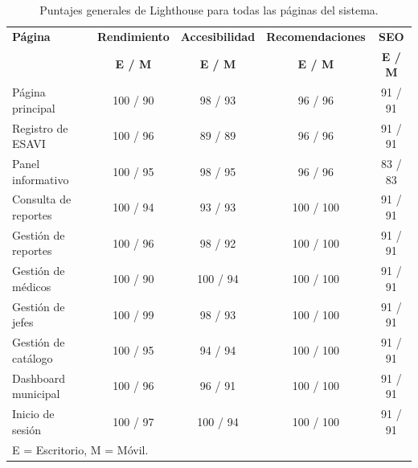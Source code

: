 \renewcommand{\arraystretch}{0.8}

\begin{table}[H]
\centering
\caption{Puntajes generales de Lighthouse para todas las páginas del sistema.}
\label{tab:anexo-categorias}
\footnotesize
\begin{tabular}{lcccc}
\hline
\textbf{Página} & \textbf{Rendimiento} & \textbf{Accesibilidad} & \textbf{Recomendaciones} & \textbf{SEO} \\
 & \textbf{E / M} & \textbf{E / M} & \textbf{E / M} & \textbf{E / M} \\
\hline
Página principal & 100 / 90 & 98 / 93 & 96 / 96 & 91 / 91 \\
Registro de ESAVI & 100 / 96 & 89 / 89 & 96 / 96 & 91 / 91 \\
Panel informativo & 100 / 95 & 98 / 95 & 96 / 96 & 83 / 83 \\
Consulta de reportes & 100 / 94 & 93 / 93 & 100 / 100 & 91 / 91 \\
Gestión de reportes & 100 / 96 & 98 / 92 & 100 / 100 & 91 / 91 \\
Gestión de médicos & 100 / 90 & 100 / 94 & 100 / 100 & 91 / 91 \\
Gestión de jefes & 100 / 99 & 98 / 93 & 100 / 100 & 91 / 91 \\
Gestión de catálogo & 100 / 95 & 94 / 94 & 100 / 100 & 91 / 91 \\
Dashboard municipal & 100 / 96 & 96 / 91 & 100 / 100 & 91 / 91 \\
Inicio de sesión & 100 / 97 & 100 / 94 & 100 / 100 & 91 / 91 \\
\hline
\multicolumn{5}{l}{\footnotesize E = Escritorio, M = Móvil.} \\
\end{tabular}
\end{table}

\vspace{-0.3cm}

